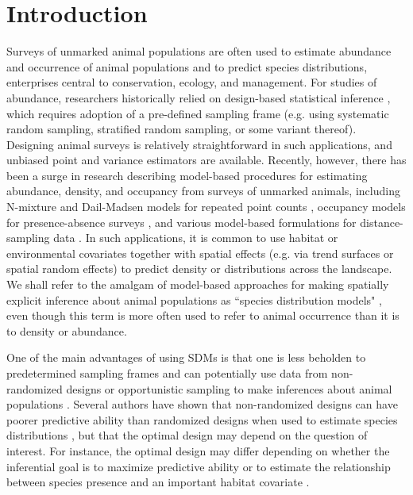 \documentclass[times,mee,doublespace,]{besauth2}
\begin{document}

\maketitle \linenumbers

\def\VAR{{\rm Var}\,}
\def\COV{{\rm Cov}\,}
\def\Prob{{\rm P}\,}
\def\bfX{\bf X}
\def\bfbeta{\boldsymbol{\beta}}
\def\bfdelta{\boldsymbol{\delta}}
\def\bfeta{\boldsymbol{\eta}}
\def\bfnu{\boldsymbol{\nu}}
\def\bfmu{\boldsymbol{\mu}}


\section{Introduction}

Surveys of unmarked animal populations are often used to estimate abundance and occurrence of animal populations and to predict species distributions, enterprises central to conservation, ecology, and management. For studies of abundance, researchers historically relied on design-based statistical inference \citep[e.g.][]{Cochran1977}, which requires adoption of a pre-defined sampling frame (e.g. using systematic random sampling, stratified random sampling, or some variant thereof).  Designing animal surveys is relatively straightforward in such applications, and unbiased point and variance estimators are available.  Recently, however, there has been a surge in research describing model-based procedures for estimating abundance, density, and occupancy from surveys of unmarked animals, including N-mixture and Dail-Madsen models for repeated point counts \citep{Royle2004a,DailMadsen2011}, occupancy models for presence-absence surveys \citep{MacKenzie2002,JohnsonEtAl2013}, and various model-based formulations for distance-sampling data \citep{HedleyBuckland2004,JohnsonEtAl2010,MillerEtAl2013}.  In such applications, it is common to use habitat or environmental covariates together with spatial effects (e.g. via trend surfaces or spatial random effects) to predict density or distributions across the landscape.  We shall refer to the amalgam of model-based approaches for making spatially explicit inference about animal populations as ``species distribution models" \citep[SDMs; {\it sensu}][]{ElithLeathwick2009}, even though this term is more often used to refer to animal occurrence than it is to density or abundance.

One of the main advantages of using SDMs is that one is less beholden to predetermined sampling frames and can potentially use data from non-randomized designs or opportunistic sampling to make inferences about animal populations \citep{JohnsonEtAl2010}. Several authors have shown that non-randomized designs can have poorer predictive ability than randomized designs when used to estimate species distributions \citep[e.g.][]{EdwardsEtAl2006,AlbertEtAl2010}, but that the optimal design may depend on the question of interest.  For instance, the optimal design may differ depending on whether the inferential goal is to maximize predictive ability or to estimate the relationship between species presence and an important habitat covariate \citep{AlbertEtAl2010}.
\end{document}
